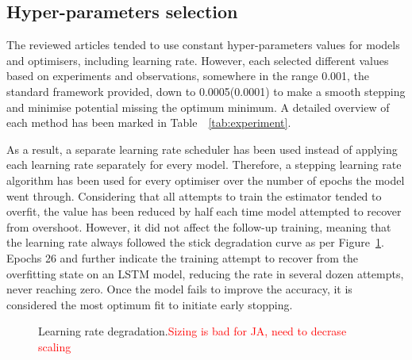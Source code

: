 \subsection{Hyper-parameters selection} \label{subsec:l-rate}
%
The reviewed articles tended to use constant hyper-parameters values for models and optimisers, including learning rate.
However, each selected different values based on experiments and observations, somewhere in the range 0.001, the standard framework provided, down to 0.0005(0.0001) to make a smooth stepping and minimise potential missing the optimum minimum.
A detailed overview of each method has been marked in \mbox{Table ~\ref{tab:experiment}}.

%
As a result, a separate learning rate scheduler has been used instead of applying each learning rate separately for every model.
Therefore, a stepping learning rate algorithm has been used for every optimiser over the number of epochs the model went through.
Considering that all attempts to train the estimator tended to overfit, the value has been reduced by half each time model attempted to recover from overshoot.
However, it did not affect the follow-up training, meaning that the learning rate always followed the stick degradation curve as per Figure~\ref{fig:l_rate_progress}.
Epochs 26 and further indicate the training attempt to recover from the overfitting state on an LSTM model, reducing the rate in several dozen attempts, never reaching zero.
Once the model fails to improve the accuracy, it is considered the most optimum fit to initiate early stopping.
\begin{figure}[ht]
    \centering
    
    \caption{Learning rate degradation.\textcolor{red}{Sizing is bad for JA, need to decrase scaling}}
    \label{fig:l_rate_progress}
\end{figure}

